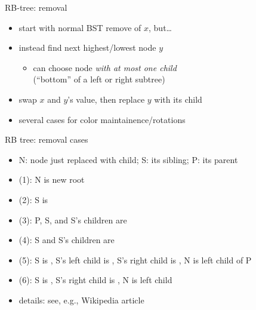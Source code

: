 \begin{frame}{RB-tree: removal}
\begin{itemize}
\item start with normal BST remove of $x$, but\ldots
\item instead find next highest/lowest node $y$
    \begin{itemize}
    \item can choose node \textit{with at most one child} \\
            (``bottom'' of a left or right subtree)
    \end{itemize}
\item swap $x$ and $y$'s value, then replace $y$ with its child
\vspace{.5cm}
\item several cases for color maintainence/rotations
\end{itemize}
\end{frame}

\begin{frame}{RB tree: removal cases}
\begin{itemize}
\item N: node just replaced with child; S: its sibling; P: its parent
\vspace{.5cm}
\item (1): N is new root
\item (2): S is 
\item (3): P, S, and S's children are 
\item (4): S and S's children are 
\item (5): S is , S's left child is , S's right child is , N is left child of P
\item (6): S is , S's right child is , N is left child
\vspace{.5cm}
\item details: see, e.g., Wikipedia article
\end{itemize}
\end{frame}
